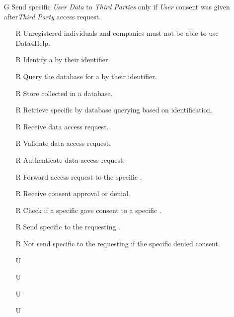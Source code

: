 \documentclass[../../rasd.tex]{subfiles}
\begin{document}
\begin{itemize}
            \item[G\subs{2}]Send specific \textit{User Data} to \textit{Third Parties} only if \textit{User} consent was given after\textit{Third Party} access request.
            \begin{itemize}
                \item[R\subs{1}]Unregistered individuals and companies must not be able to use Data4Help.
                \item[R\subs{6}]Identify a  by their identifier.
                \item[R\subs{7}]Query the database for a  by their identifier.
                \item[R\subs{11}]Store collected  in a database.
                \item[R\subs{12}]Retrieve specific  by database querying based on  identification.
                \item[R\subs{13}]Receive  data access request.
                \item[R\subs{14}]Validate  data access request.
                \item[R\subs{15}]Authenticate  data access request.
                \item[R\subs{16}]Forward  access request to the specific .
                \item[R\subs{17}]Receive  consent approval or denial.
                \item[R\subs{18}]Check if a specific  gave consent to a specific .
                \item[R\subs{19}]Send specific to the requesting .
                \item[R\subs{20}]Not send specific to the requesting  if the specific  denied consent.
                \\
                \item[U\subs{2}] 
                \item[U\subs{4}] 
                \item[U\subs{5}] 
                \item[U\subs{10}] 
            \end{itemize}


\end{itemize}
\end{document}
